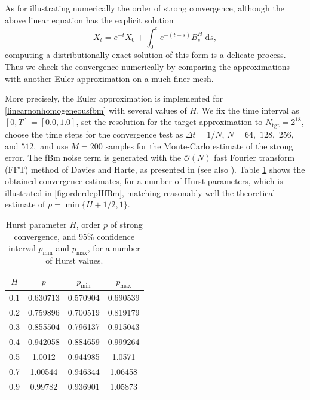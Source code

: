 \documentclass[reqno,12pt]{amsart}
\theoremstyle{plain} %
\theoremstyle{definition} %
\begin{document}
As for illustrating numerically the order of strong convergence, although the above linear equation has the explicit solution
\begin{equation}
    X_t = e^{-t}X_0 + \int_0^t e^{-(t-s)}B^H_s\;\mathrm{d}s,
\end{equation}
computing a distributionally exact solution of this form is a delicate process. Thus we check the convergence numerically by comparing the approximations with another Euler approximation on a much finer mesh.

More precisely, the Euler approximation is implemented for \eqref{linearnonhomogeneousfbm} with several values of $H$. We fix the time interval as $[0, T] = [0.0, 1.0]$, set the resolution for the target approximation to $N_{\textrm{tgt}} = 2^{18}$, choose the time steps for the convergence test as $\Delta t = 1/N$,  $N = 64,$ $128,$ $256,$ and $512,$ and use $M = 200$ samples for the Monte-Carlo estimate of the strong error. The fBm noise term is generated with the $\mathcal{O}(N)$ fast Fourier transform (FFT) method of Davies and Harte, as presented in \cite{DiekerMandjes2003} (see also \cite[Section 14.4]{HanKloeden2017}). Table \ref{taborderdepHfBm} shows the obtained convergence estimates, for a number of Hurst parameters, which is illustrated in \cref{figorderdepHfBm}, matching reasonably well the theoretical estimate of $p = \min\{H+1/2, 1\}.$

\begin{table}
    \begin{tabular}[htb]{|c|c|c|c|}
        \hline $H$ & $p$ & $p_{\textrm{min}}$ & $p_{\textrm{max}}$ \\
        \hline \hline
        0.1 & 0.630713 & 0.570904 & 0.690539 \\
        0.2 & 0.759896 & 0.700519 & 0.819179 \\
        0.3 & 0.855504 & 0.796137 & 0.915043 \\
        0.4 & 0.942058 & 0.884659 & 0.999264 \\
        0.5 & 1.0012   & 0.944985 & 1.0571 \\
        0.7 & 1.00544  & 0.946344 & 1.06458 \\
        0.9 & 0.99782  & 0.936901 & 1.05873 \\
        \hline
    \end{tabular}
    \bigskip

    \caption{Hurst parameter $H$, order $p$ of strong convergence, and 95\% confidence interval $p_{\textrm{min}}$ and $p_{\textrm{max}}$, for a number of Hurst values.}
    \label{taborderdepHfBm}
\end{table}
\end{document}
